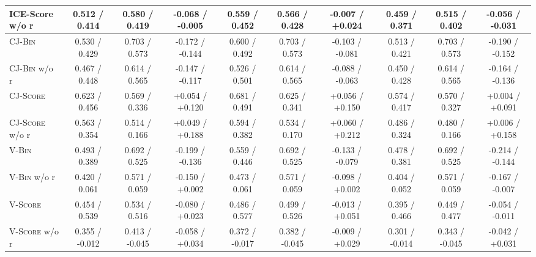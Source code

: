\begin{table}[t]
\begin{tabular}{@{}l|ccc|ccc|ccc@{}}
        ICE-Score w/o r         & 0.512 / 0.414   & 0.580 / 0.419   & -0.068 / -0.005                     & 0.559 / 0.452   & 0.566 / 0.428   & -0.007 / +0.024                     & 0.459 / 0.371   & 0.515 / 0.402   & -0.056 / -0.031                     \\
        \midrule
        \textsc{CJ-Bin}         & 0.530 / 0.429   & 0.703 / 0.573   & -0.172 / -0.144                     & 0.600 / 0.492   & 0.703 / 0.573   & -0.103 / -0.081                     & 0.513 / 0.421   & 0.703 / 0.573   & -0.190 / -0.152                     \\
        \textsc{CJ-Bin} w/o r   & 0.467 / 0.448   & 0.614 / 0.565   & -0.147 / -0.117                     & 0.526 / 0.501   & 0.614 / 0.565   & -0.088 / -0.063                     & 0.450 / 0.428   & 0.614 / 0.565   & -0.164 / -0.136                     \\
        \textsc{CJ-Score}       & 0.623 / 0.456   & 0.569 / 0.336   & +0.054 / +0.120                     & 0.681 / 0.491   & 0.625 / 0.341   & +0.056 / +0.150                     & 0.574 / 0.417   & 0.570 / 0.327   & +0.004 / +0.091                     \\
        \textsc{CJ-Score} w/o r & 0.563 / 0.354   & 0.514 / 0.166   & +0.049 / +0.188                     & 0.594 / 0.382   & 0.534 / 0.170   & +0.060 / +0.212                     & 0.486 / 0.324   & 0.480 / 0.166   & +0.006 / +0.158                     \\
        \midrule
        \textsc{V-Bin}          & 0.493 / 0.389   & 0.692 / 0.525   & -0.199 / -0.136                     & 0.559 / 0.446   & 0.692 / 0.525   & -0.133 / -0.079                     & 0.478 / 0.381   & 0.692 / 0.525   & -0.214 / -0.144                     \\
        \textsc{V-Bin} w/o r    & 0.420 / 0.061   & 0.571 / 0.059   & -0.150 / +0.002                     & 0.473 / 0.061   & 0.571 / 0.059   & -0.098 / +0.002                     & 0.404 / 0.052   & 0.571 / 0.059   & -0.167 / -0.007                     \\
        \textsc{V-Score}        & 0.454 / 0.539   & 0.534 / 0.516   & -0.080 / +0.023                     & 0.486 / 0.577   & 0.499 / 0.526   & -0.013 / +0.051                     & 0.395 / 0.466   & 0.449 / 0.477   & -0.054 / -0.011                     \\
        \textsc{V-Score} w/o r  & 0.355 / -0.012  & 0.413 / -0.045  & -0.058 / +0.034                     & 0.372 / -0.017  & 0.382 / -0.045  & -0.009 / +0.029                     & 0.301 / -0.014  & 0.343 / -0.045  & -0.042 / +0.031                     \\

\end{tabular}
\end{table}
